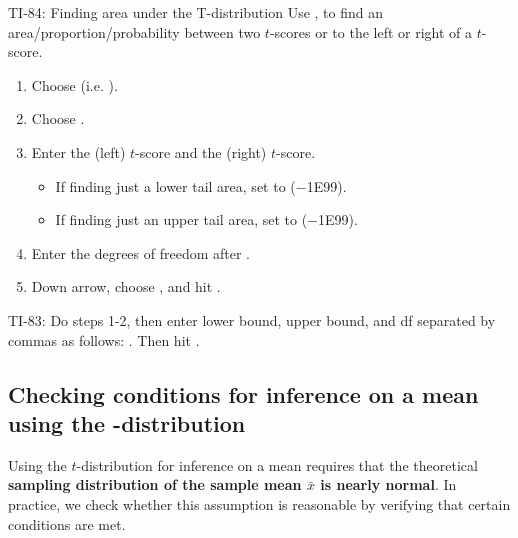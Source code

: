 \begin{onebox}{TI-84: Finding area under the T-distribution}
Use  ,  to find an area/proportion/probability between two $t$-scores or to the left or right of a $t$-score.\vspace{-1mm}
\begin{enumerate}
\setlength{\itemsep}{0mm}
\item Choose   (i.e. ).
\item Choose .
\item Enter the  (left) $t$-score and the  (right) $t$-score.
\vspace{-1.5mm}
  \begin{itemize}
  \setlength{\itemsep}{0mm}
  \item If finding just a lower tail area, set  to \calctext{-$\infty$} ($-$1E99).
  \item If finding just an upper tail area, set  to \calctext{$\infty$} ($-$1E99).
\end{itemize}
\item Enter the degrees of freedom after .
\item Down arrow, choose , and hit .\vspace{-1.5mm}
\end{enumerate}
TI-83: Do steps 1-2, then enter lower bound, upper bound, and df separated by commas as follows:  .  Then hit .\end{onebox}
 



\D{\newpage}

\subsection[Checking conditions for inference on a mean using the $t$-distribution]{Checking conditions for inference on a mean using the -distribution}
\label{tDistSolutionToSEProblem}

Using the $t$-distribution for inference on a mean requires that the theoretical \textbf{sampling distribution of the sample mean $\bar{x}$ is nearly normal}.  In practice, we check whether this assumption is reasonable by verifying that certain conditions are met.  



